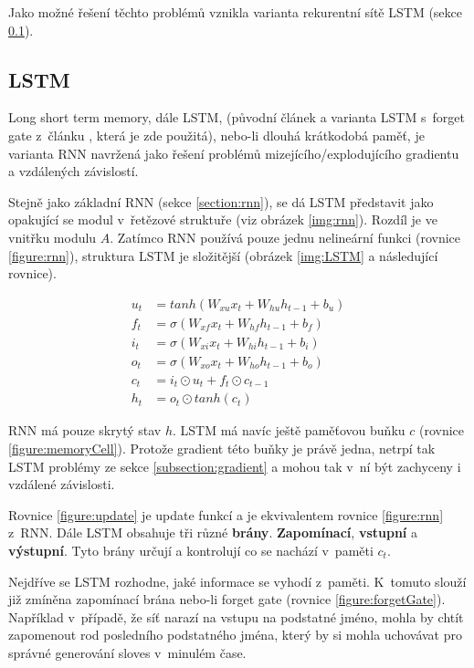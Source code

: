 Jako možné řešení těchto problémů vznikla varianta rekurentní sítě LSTM (sekce \ref{section:LSTM}).


\subsection{LSTM}\label{section:LSTM}
Long short term memory, dále LSTM, (původní článek \cite{LSTM} a varianta LSTM s~forget gate z~článku \cite{forgetLSTM}, která je zde použitá), nebo-li dlouhá krátkodobá paměť, je varianta RNN navržená jako řešení problémů mizejícího/explodujícího gradientu a vzdálených závislostí.

Stejně jako základní RNN (sekce \ref{section:rnn}), se dá LSTM představit jako opakující se modul v~řetězové struktuře (viz obrázek \ref{img:rnn}). Rozdíl je ve vnitřku modulu $A$. Zatímco RNN používá pouze jednu nelineární funkci (rovnice \ref{figure:rnn}), struktura LSTM je složitější (obrázek \ref{img:LSTM} a následující rovnice).

\begin{align}
    u_{t}&=tanh(W_{xu}x_t + W_{hu}h_{t-1} + b_u) \label{figure:update} \\
    f_{t}&=\sigma(W_{xf}x_{t}+W_{hf}h_{t-1}+b_{f}) \label{figure:forgetGate} \\
    i_{t}&=\sigma(W_{xi}x_{t}+W_{hi}h_{t-1}+b_{i}) \label{figure:inputGate} \\
    o_{t}&=\sigma(W_{xo}x_{t}+W_{ho}h_{t-1}+b_{o}) \label{figure:outputGate} \\
    c_{t}&=i_{t}\odot u_{t}+f_{t}\odot c_{t-1}\label{figure:memoryCell} \\
    h_{t}&=o_{t}\odot tanh(c_{t}) \label{figure:hiddenState}
\end{align}

RNN má pouze skrytý stav $h$. LSTM má navíc ještě paměťovou buňku $c$ (rovnice \ref{figure:memoryCell}). Protože gradient této buňky je právě jedna, netrpí tak LSTM problémy ze sekce \ref{subsection:gradient} a mohou tak v~ní být zachyceny i vzdálené závislosti.

Rovnice \ref{figure:update} je update funkcí a je ekvivalentem rovnice \ref{figure:rnn} z~RNN.
Dále LSTM obsahuje tři různé \textbf{brány}. \textbf{Zapomínací}, \textbf{vstupní} a \textbf{výstupní}. Tyto brány určují a kontrolují co se nachází v~paměti $c_t$.

Nejdříve se LSTM rozhodne, jaké informace se vyhodí z~paměti. K~tomuto slouží již zmíněna zapomínací brána nebo-li forget gate (rovnice \ref{figure:forgetGate}). Například v~případě, že síť narazí na vstupu na podstatné jméno, mohla by chtít zapomenout rod posledního podstatného jména, který by si mohla uchovávat pro správné generování sloves v~minulém čase.

